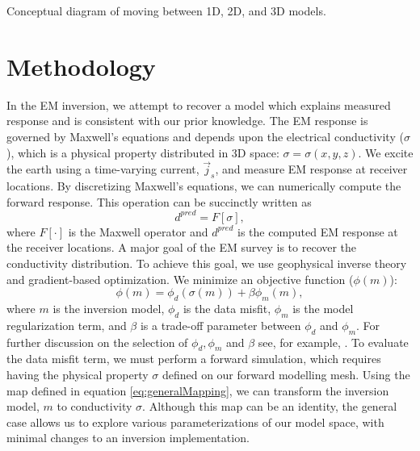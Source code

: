 \documentclass{segabs}
\renewcommand {\j}  { {\vec j} }
\begin{document}
{Conceptual diagram of moving between 1D, 2D, and 3D models.}

\section*{Methodology}
In the EM inversion, we attempt to recover a model which explains measured response and is consistent with our prior knowledge. The EM response is governed by Maxwell's equations and depends upon the electrical conductivity ($\sigma$), which is a physical property distributed in 3D space: $\sigma = \sigma(x, y, z)$. We excite the earth using a time-varying current, $\j_s$, and measure EM response at receiver locations. By discretizing Maxwell's equations, we can numerically compute the forward response. This operation can be succinctly written as
\begin{equation}
  d^{pred} = F[\sigma],
\end{equation}
where $F[\cdot]$ is the Maxwell operator and $d^{pred}$ is the computed EM response at the receiver locations.
A major goal of the EM survey is to recover the conductivity distribution. To achieve this goal, we use geophysical inverse theory and gradient-based optimization. We minimize an objective function ($\phi(m)$):
\begin{equation}
  \phi(m) = \phi_d(\sigma(m)) + \beta\phi_m(m),
\end{equation}
where $m$ is the inversion model, $\phi_d$ is the data misfit, $\phi_m$ is the model regularization term, and $\beta$ is a trade-off parameter between $\phi_d$ and $\phi_m$. For further discussion on the selection of $\phi_d, \phi_m$ and $\beta$ see, for example, \cite{DougTutorial}. To evaluate the data misfit term, we must perform a forward simulation, which requires having the physical property $\sigma$ defined on our forward modelling mesh. Using the map defined in equation \ref{eq:generalMapping}, we can transform the inversion model, $m$ to conductivity $\sigma$. Although this map can be an identity, the general case allows us to explore various parameterizations of our model space, with minimal changes to an inversion implementation.
\end{document}
